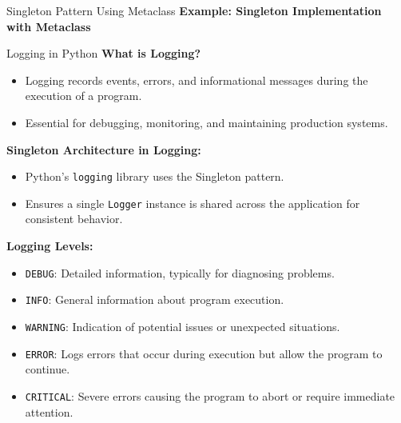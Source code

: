 \documentclass[10pt]{beamer}
\let\olditem\item
\renewcommand\item{\olditem\justifying}
\begin{document}
	
	\begin{frame}[fragile]{Singleton Pattern Using Metaclass}
		\textbf{Example: Singleton Implementation with Metaclass}
		
	\end{frame}
	
	
	\begin{frame}{Logging in Python}
		\textbf{What is Logging?}
		\begin{itemize}
			\item Logging records events, errors, and informational messages during the execution of a program.
			\item Essential for debugging, monitoring, and maintaining production systems.
		\end{itemize}
		
		\textbf{Singleton Architecture in Logging:}
		\begin{itemize}
			\item Python's \texttt{logging} library uses the Singleton pattern.
			\item Ensures a single \texttt{Logger} instance is shared across the application for consistent behavior.
		\end{itemize}
		
		\textbf{Logging Levels:}
		\begin{itemize}
			\item \texttt{DEBUG}: Detailed information, typically for diagnosing problems.
			\item \texttt{INFO}: General information about program execution.
			\item \texttt{WARNING}: Indication of potential issues or unexpected situations.
			\item \texttt{ERROR}: Logs errors that occur during execution but allow the program to continue.
			\item \texttt{CRITICAL}: Severe errors causing the program to abort or require immediate attention.
		\end{itemize}
	\end{frame}
		
\end{document}
